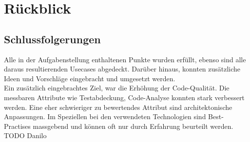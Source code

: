 \chapter{Rückblick}

\section{Schlussfolgerungen}

Alle in der Aufgabenstellung enthaltenen Punkte wurden erfüllt, ebenso sind alle
daraus resultierenden Usecases abgedeckt. Darüber hinaus, konnten zusätzliche
Ideen und Vorschläge eingebracht und umgesetzt werden.\\
Ein zusätzlich eingebrachtes Ziel, war die Erhöhung der Code-Qualität. Die messbaren Attribute wie Testabdeckung, Code-Analyse konnten stark verbessert werden. Eine eher schwieriger zu bewertendes Attribut sind architektonische Anpassungen. Im Speziellen bei den verwendeten Technologien sind Best-Practises massgebend und können oft nur durch Erfahrung beurteilt werden. TODO Danilo


